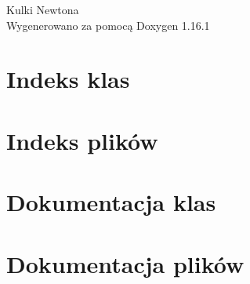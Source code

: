 \documentclass[twoside]{book}
\newcommand{\+}{\discretionary{\mbox{\scriptsize$\hookleftarrow$}}{}{}}
\newcommand{\clearemptydoublepage}{%
    \newpage{\pagestyle{empty}\cleardoublepage}%
  }
\begin{document}
  \raggedbottom
    \hypersetup{pageanchor=false,
                bookmarksnumbered=true,
                pdfencoding=unicode
               }
  \begin{titlepage}
  \vspace*{7cm}
  \begin{center}%
  {\Large Kulki Newtona}\\
  \vspace*{1cm}
  {\large Wygenerowano za pomocą Doxygen 1.16.1}\\
  \end{center}
  \end{titlepage}
  \clearemptydoublepage
  \tableofcontents
  \clearemptydoublepage
  \hypersetup{pageanchor=true}
\chapter{Indeks klas}

\chapter{Indeks plików}

\chapter{Dokumentacja klas}

\chapter{Dokumentacja plików}

  \backmatter
  \newpage
  \clearemptydoublepage
  \printindex
\end{document}
